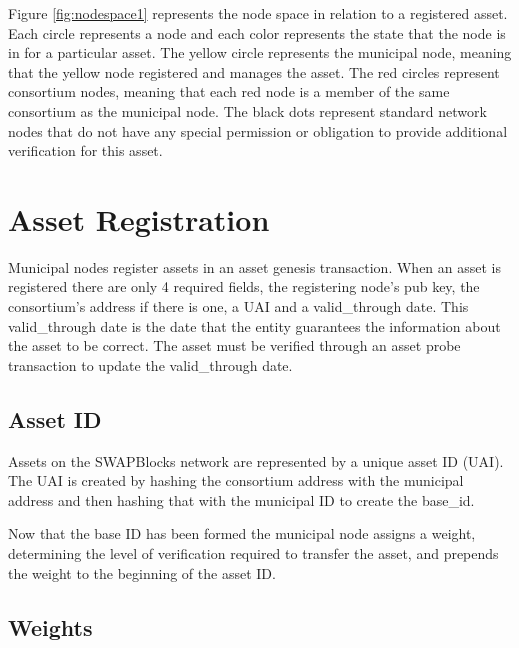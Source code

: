 \documentclass[12pt]{article}
\begin{document}
Figure \ref{fig:nodespace1} represents the node space in relation to a registered asset.
Each circle represents a node and each color represents the state that the
node is in for a particular asset.  The yellow circle represents the municipal node, meaning
that the yellow node registered and manages the asset.  The red circles represent consortium 
nodes, meaning that each red node is a member of the same consortium as the municipal node.
The black dots represent standard network nodes that do not have any special permission or
obligation to provide additional verification for this asset.






\section{Asset Registration}

Municipal nodes register assets in an asset genesis transaction.  When 
an asset is registered there are only 4 required fields, the registering node's 
pub key, the consortium's address if there is one, a UAI and a valid\_through date.  
This valid\_through date is the date that the entity guarantees the information 
about the asset to be correct.  The asset must be verified through an asset probe 
transaction to update the valid\_through date.

\subsection{Asset ID}

Assets on the SWAPBlocks network are represented by a unique asset ID (UAI).  
The UAI is created by hashing the consortium address with the municipal address 
and then hashing that with the municipal ID to create the base\_id.





Now that the base ID has been formed the municipal node assigns 
a weight, determining the level of verification required to transfer 
the asset, and prepends the weight to the beginning of the asset ID.

\subsection{Weights}
\end{document}
